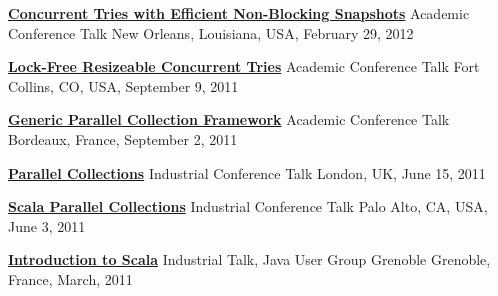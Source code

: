 \documentclass[9pt]{article}
\begin{document}
\noindent\href{http://axel22.github.io/resources/docs/ctries-snapshots.pptx}
{\bf Concurrent Tries with Efficient Non-Blocking Snapshots}
\vspace{-0.03in}
\newline\noindent Academic Conference Talk
\dates{}
\linebreak\noindent New Orleans, Louisiana, USA, February 29, 2012
\bigskip

\noindent
\href{http://lcpc11.cs.colostate.edu/}
{\bf Lock-Free Resizeable Concurrent Tries}
\vspace{-0.03in}
\newline\noindent Academic Conference Talk
\dates{}
\linebreak\noindent Fort Collins, CO, USA, September 9, 2011
\bigskip

\noindent
\href{http://europar2011.bordeaux.inria.fr/conference.php}
{\bf Generic Parallel Collection Framework}
\vspace{-0.03in}
\newline\noindent Academic Conference Talk
\dates{}
\linebreak\noindent Bordeaux, France, September 2, 2011
\bigskip

\noindent\href{https://skillsmatter.com/skillscasts/2236-parallel-collections}
{\bf Parallel Collections}
\vspace{-0.03in}
\newline\noindent Industrial Conference Talk
\dates{}
\linebreak\noindent London, UK, June 15, 2011
\bigskip

\noindent
\href{http://days2011.scala-lang.org/node/138/272/29.%20Parallel%20Collections.mp4}
{\bf Scala Parallel Collections}
\vspace{-0.03in}
\newline\noindent Industrial Conference Talk
\dates{}
\linebreak\noindent Palo Alto, CA, USA, June 3, 2011
\bigskip

\noindent
\href{http://www.slideshare.net/AleksandarProkopec/introduction-to-scala-39540464}
{\bf Introduction to Scala}
\vspace{-0.03in}
\newline\noindent Industrial Talk, Java User Group Grenoble
\dates{}
\linebreak\noindent Grenoble, France, March, 2011
\bigskip
\end{document}
